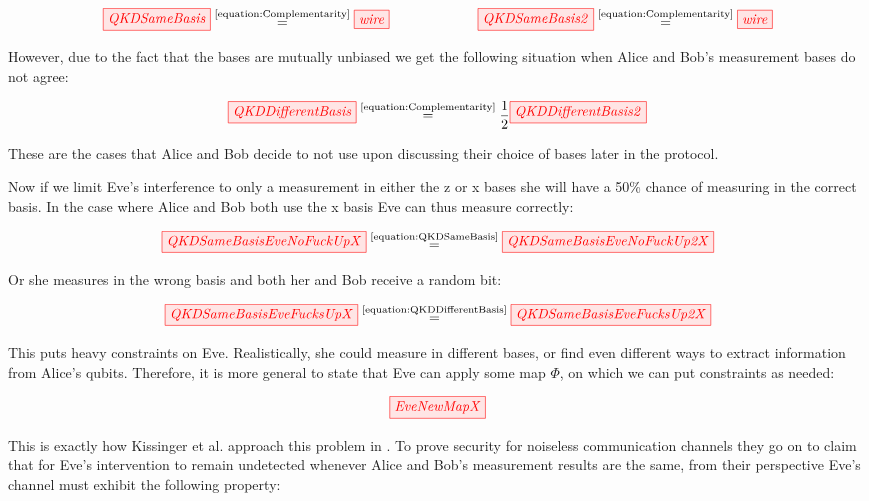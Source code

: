 \documentclass[]{article}
\newcommand{\equaltext}[1]{\ensuremath{\stackrel{\text{#1}}{=}}}
\begin{document}
\begin{equation}
	\label{equation:QKDSameBasis}
	\tikzfig{QKDSameBasis} \equaltext{\ref{equation:Complementarity}} \tikzfig{wire} ~~~~~~~~~~~~~~~~~~~ \tikzfig{QKDSameBasis2} \equaltext{\ref{equation:Complementarity}} \tikzfig{wire}
\end{equation}

However, due to the fact that the bases are mutually unbiased we get the following situation when Alice and Bob's measurement bases do not agree:

\begin{equation}
\label{equation:QKDDifferentBasis}
\tikzfig{QKDDifferentBasis} \equaltext{\ref{equation:Complementarity}} \frac{1}{2} \tikzfig{QKDDifferentBasis2}
\end{equation}

These are the cases that Alice and Bob decide to not use upon discussing their choice of bases later in the protocol.

Now if we limit Eve's interference to only a measurement in either the z or x bases she will have a 50\% chance of measuring in the correct basis. In the case where Alice and Bob both use the x basis Eve can thus measure correctly:

\begin{equation}
	\tikzfig{QKDSameBasisEveNoFuckUpX} \equaltext{\ref{equation:QKDSameBasis}} \tikzfig{QKDSameBasisEveNoFuckUp2X} 
\end{equation}

Or she measures in the wrong basis and both her and Bob receive a random bit:

\begin{equation}
	\tikzfig{QKDSameBasisEveFucksUpX} \equaltext{\ref{equation:QKDDifferentBasis}} \tikzfig{QKDSameBasisEveFucksUp2X}
\end{equation}

This puts heavy constraints on Eve. Realistically, she could measure in different bases, or find even different ways to extract information from Alice's qubits. Therefore, it is more general to state that Eve can apply some map $\Phi$, on which we can put constraints as needed:

\begin{equation}
	\label{equation:EveNewMap}
	\tikzfig{EveNewMapX}
\end{equation}

This is exactly how Kissinger et al. approach this problem in \cite{Kissinger2017}. To prove security for noiseless communication channels they go on to claim that for Eve's intervention to remain undetected whenever Alice and Bob's measurement results are the same, from their perspective Eve's channel must exhibit the following property:
\end{document}
